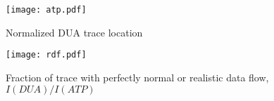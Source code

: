 \begin{figure}
\centering
\texttt{[image: atp.pdf]}
\caption{Normalized DUA trace location}
\label{fig:atp-hist}
\end{figure}

\begin{figure}
\centering
\texttt{[image: rdf.pdf]}
\caption{Fraction of trace with perfectly normal or realistic data flow, $I(DUA)/I(ATP)$}
\label{fig:rdf-hist}
\end{figure}




